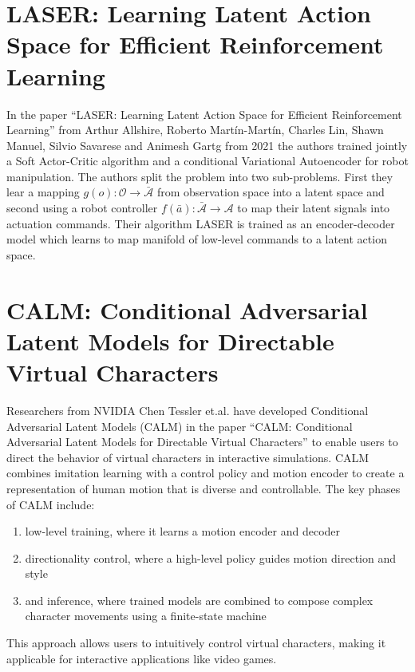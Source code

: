 \section{LASER: Learning Latent Action Space for Efficient Reinforcement Learning}

In the paper ``LASER: Learning Latent Action Space for Efficient Reinforcement Learning'' from Arthur Allshire, Roberto Martín-Martín, Charles Lin, Shawn Manuel, Silvio Savarese and Animesh Gartg from 2021 \cite{LASER} the authors trained jointly a Soft Actor-Critic algorithm and a conditional Variational Autoencoder for robot manipulation. The authors split the problem into two sub-problems. First they lear a mapping $g(o): \mathcal{O} \to \bar{\mathcal{A}}$ from observation space into a latent space and second using a robot controller $f(\bar{a}): \bar{\mathcal{A}} \to \mathcal{A}$ to map their latent signals into actuation commands. Their algorithm LASER is trained as an encoder-decoder model which learns to map manifold of low-level commands to a latent action space. 

% 





\section{CALM: Conditional Adversarial Latent Models for Directable Virtual Characters}

Researchers from NVIDIA  Chen Tessler et.al. have developed Conditional Adversarial Latent Models (CALM)  in the paper ``CALM: Conditional Adversarial Latent Models for Directable Virtual Characters''\cite{CALM} to enable users to direct the behavior of virtual characters in interactive simulations. CALM combines imitation learning with a control policy and motion encoder to create a representation of human motion that is diverse and controllable. The key phases of CALM include:
\begin{enumerate}
    \item low-level training, where it learns a motion encoder and decoder
    \item directionality control, where a high-level policy guides motion direction and style
    \item and inference, where trained models are combined to compose complex character movements using a finite-state machine
\end{enumerate}
This approach allows users to intuitively control virtual characters, making it applicable for interactive applications like video games.